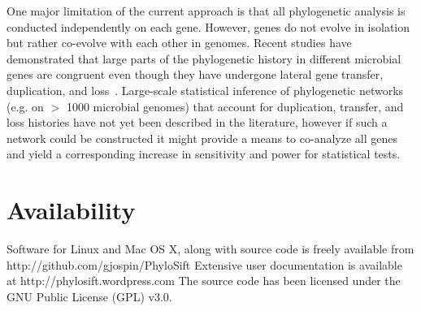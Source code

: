 \documentclass[10pt]{article}
\begin{document}
One major limitation of the current approach is that all phylogenetic analysis is conducted independently on each gene.
However, genes do not evolve in isolation but rather co-evolve with each other in genomes.
Recent studies have demonstrated that large parts of the phylogenetic history in different microbial genes are congruent even though they have undergone lateral gene transfer, duplication, and loss~\cite{Szollosi2012,Boussau2012}.
Large-scale statistical inference of phylogenetic networks (e.g. on $>$ 1000 microbial genomes) that account for duplication, transfer, and loss histories have not yet been described in the literature, however if such a network could be constructed it might provide a means to co-analyze all genes and yield a corresponding increase in sensitivity and power for statistical tests.

\section*{Availability}
Software for Linux and Mac OS X, along with source code is freely available from http://github.com/gjospin/PhyloSift
Extensive user documentation is available at http://phylosift.wordpress.com
The source code has been licensed under the GNU Public License (GPL) v3.0.




\clearpage
\end{document}
